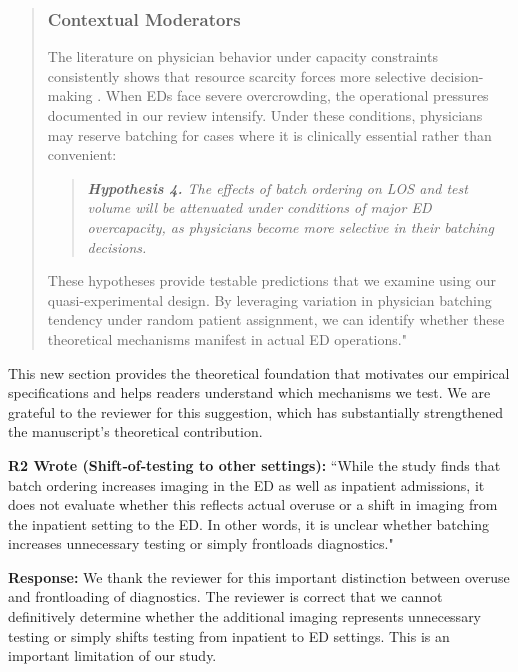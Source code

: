\documentclass[11pt]{article}
\newenvironment{quote2}
{ \bigskip
\noindent
         \small\em
         \baselineskip=14pt
}
\newcommand{\1}{\hbox{\rm 1\kern-.35em 1}}
\begin{document}
{\begin{quote}
\subsubsection*{Contextual Moderators}

The literature on physician behavior under capacity constraints consistently shows that resource scarcity forces more selective decision-making \citep{kuntz2014stress, kc2009impact}. When EDs face severe overcrowding, the operational pressures documented in our review intensify. Under these conditions, physicians may reserve batching for cases where it is clinically essential rather than convenient:

\begin{quote}
\small
\textit{\textbf{Hypothesis 4.} The effects of batch ordering on LOS and test volume will be attenuated under conditions of major ED overcapacity, as physicians become more selective in their batching decisions.}
\end{quote}

These hypotheses provide testable predictions that we examine using our quasi-experimental design. By leveraging variation in physician batching tendency under random patient assignment, we can identify whether these theoretical mechanisms manifest in actual ED operations."
\end{quote}

This new section provides the theoretical foundation that motivates our empirical specifications and helps readers understand which mechanisms we test. We are grateful to the reviewer for this suggestion, which has substantially strengthened the manuscript's theoretical contribution.

\color{black}


\begin{quote2}
\textbf{R2 Wrote (Shift‑of‑testing to other settings):}  
``While the study finds that batch ordering increases imaging in the ED as well as inpatient admissions, it does not evaluate whether this reflects actual overuse or a shift in imaging from the inpatient setting to the ED. In other words, it is unclear whether batching increases unnecessary testing or simply frontloads diagnostics."

\end{quote2}

\noindent\textbf{Response:} \color{blue}We thank the reviewer for this important distinction between overuse and frontloading of diagnostics. The reviewer is correct that we cannot definitively determine whether the additional imaging represents unnecessary testing or simply shifts testing from inpatient to ED settings. This is an important limitation of our study.

}
\end{document}
